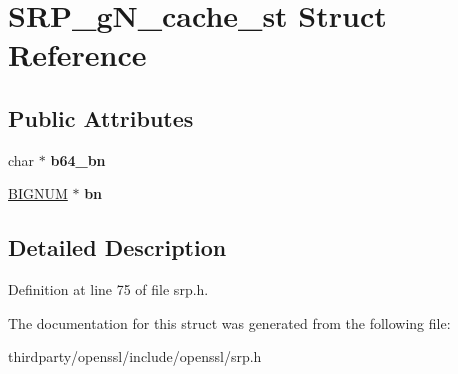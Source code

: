 \hypertarget{struct_s_r_p__g_n__cache__st}{}\section{S\+R\+P\+\_\+g\+N\+\_\+cache\+\_\+st Struct Reference}
\label{struct_s_r_p__g_n__cache__st}
\subsection*{Public Attributes}
\begin{DoxyCompactItemize}
\item 
\mbox{\label{struct_s_r_p__g_n__cache__st_a1dd9c70bac46d3829e31d89c4989617b}} 
char $\ast$ {\bfseries b64\+\_\+bn}
\item 
\mbox{\label{struct_s_r_p__g_n__cache__st_a9dc3091a4c8af3b6b5747ba3f455c264}} 
\hyperlink{structbignum__st}{B\+I\+G\+N\+UM} $\ast$ {\bfseries bn}
\end{DoxyCompactItemize}


\subsection{Detailed Description}


Definition at line 75 of file srp.\+h.



The documentation for this struct was generated from the following file\+:\begin{DoxyCompactItemize}
\item 
thirdparty/openssl/include/openssl/srp.\+h\end{DoxyCompactItemize}
